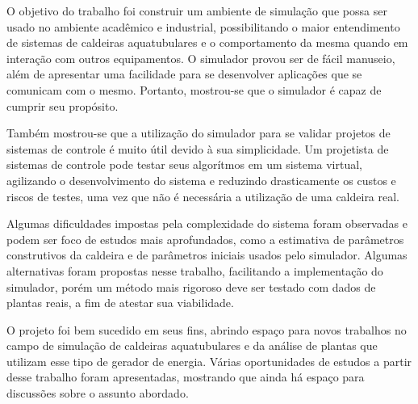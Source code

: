 O objetivo do trabalho foi construir um ambiente de simulação que
possa ser usado no ambiente acadêmico e industrial, possibilitando o
maior entendimento de sistemas de caldeiras aquatubulares e o
comportamento da mesma quando em interação com outros equipamentos. O
simulador provou ser de fácil manuseio, além de apresentar uma
facilidade para se desenvolver aplicações que se comunicam com o
mesmo. Portanto, mostrou-se que o simulador é capaz de cumprir seu
propósito.

Também mostrou-se que a utilização do simulador para se validar
projetos de sistemas de controle é muito útil devido à sua
simplicidade. Um projetista de sistemas de controle pode testar seus
algorítmos em um sistema virtual, agilizando o desenvolvimento do
sistema e reduzindo drasticamente os custos e riscos de testes, uma
vez que não é necessária a utilização de uma caldeira real.

Algumas dificuldades impostas pela complexidade do sistema foram
observadas e podem ser foco de estudos mais aprofundados, como a
estimativa de parâmetros construtivos da caldeira e de parâmetros
iniciais usados pelo simulador. Algumas alternativas foram propostas
nesse trabalho, facilitando a implementação do simulador, porém um
método mais rigoroso deve ser testado com dados de plantas reais, a
fim de atestar sua viabilidade.

O projeto foi bem sucedido em seus fins, abrindo espaço para novos
trabalhos no campo de simulação de caldeiras aquatubulares e da
análise de plantas que utilizam esse tipo de gerador de
energia. Várias oportunidades de estudos a partir desse trabalho foram
apresentadas, mostrando que ainda há espaço para discussões sobre o
assunto abordado.
